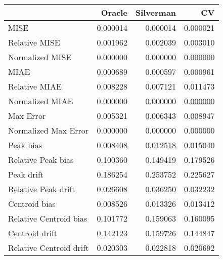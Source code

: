\begin{tabular}{lrrr}
  \hline
 & Oracle & Silverman & CV \\ 
  \hline
MISE & 0.000014 & 0.000014 & 0.000021 \\ 
  Relative MISE & 0.001962 & 0.002039 & 0.003010 \\ 
  Normalized MISE & 0.000000 & 0.000000 & 0.000000 \\ 
  MIAE & 0.000689 & 0.000597 & 0.000961 \\ 
  Relative MIAE & 0.008228 & 0.007121 & 0.011473 \\ 
  Normalized MIAE & 0.000000 & 0.000000 & 0.000000 \\ 
  Max Error & 0.005321 & 0.006343 & 0.008947 \\ 
  Normalized Max Error & 0.000000 & 0.000000 & 0.000000 \\ 
  Peak bias & 0.008408 & 0.012518 & 0.015040 \\ 
  Relative Peak bias & 0.100360 & 0.149419 & 0.179526 \\ 
  Peak drift & 0.186254 & 0.253752 & 0.225627 \\ 
  Relative Peak drift & 0.026608 & 0.036250 & 0.032232 \\ 
  Centroid bias & 0.008526 & 0.013326 & 0.013412 \\ 
  Relative Centroid bias & 0.101772 & 0.159063 & 0.160095 \\ 
  Centroid drift & 0.142123 & 0.159726 & 0.144847 \\ 
  Relative Centroid drift & 0.020303 & 0.022818 & 0.020692 \\ 
   \hline
\end{tabular}
